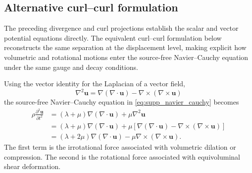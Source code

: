 \subsection*{Alternative curl--curl formulation}

The preceding divergence and curl projections establish the scalar and vector
potential equations directly. The equivalent curl--curl formulation below
reconstructs the same separation at the displacement level, making explicit how
volumetric and rotational motions enter the source-free Navier--Cauchy equation
under the same gauge and decay conditions.

Using the vector identity for the Laplacian of a vector field,
\begin{equation*}
  \nabla^2\mathbf{u}
  = \nabla(\nabla \cdot \mathbf{u}) - \nabla \times (\nabla \times \mathbf{u})
\end{equation*}
the source-free Navier--Cauchy equation in \cref{eq:supp_navier_cauchy} becomes
\begin{equation}
  \begin{aligned}
    \rho\frac{\partial^2\mathbf{u}}{\partial t^2}
    & = (\lambda + \mu)\nabla(\nabla \cdot \mathbf{u})
    + \mu\nabla^2\mathbf{u} \\
    & = (\lambda + \mu)\nabla(\nabla \cdot \mathbf{u})
    + \mu\left[\nabla(\nabla \cdot \mathbf{u})
    - \nabla \times (\nabla \times \mathbf{u})\right] \\
    & = (\lambda + 2\mu)\nabla(\nabla \cdot \mathbf{u})
    - \mu\nabla \times (\nabla \times \mathbf{u}).
  \end{aligned}
  \label{eq:supp_curl_curl_navier_cauchy}
\end{equation}
The first term is the irrotational force associated with volumetric dilation or
compression. The second is the rotational force associated with equivoluminal
shear deformation.

